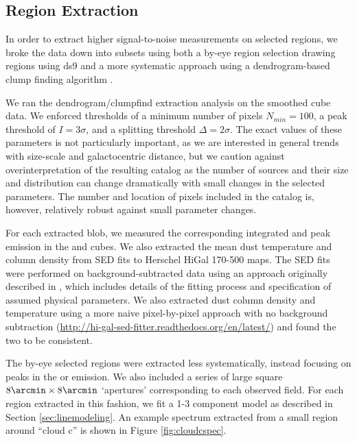 \subsection{Region Extraction}
In order to extract higher signal-to-noise measurements on selected regions, we
broke the data down into subsets using both a by-eye region selection drawing
regions using ds9 and a more systematic approach using a dendrogram-based clump
finding algorithm \citep[][\url{http://dendrograms.org/}]{Rosolowsky2008c}.

We ran the dendrogram/clumpfind extraction analysis on the smoothed
\threeohthree cube data.  We enforced thresholds of a minimum number of pixels
$N_{min}=100$, a peak threshold of $I = 3\sigma$, and a splitting threshold
$\Delta = 2\sigma$.  The exact values of these parameters is not particularly
important, as we are interested in general trends with size-scale and
galactocentric distance, but we caution against overinterpretation of the
resulting catalog as the number of sources and their size and distribution can
change dramatically with small changes in the selected parameters.  The number
and location of pixels included in the catalog is, however, relatively robust
against small parameter changes.

For each extracted blob, we measured the corresponding integrated and peak
emission in the \threetwoone and \thirteenco cubes.  We also extracted the mean
dust temperature and column density from SED fits to Herschel HiGal 170-500\um
maps.  The SED fits were performed on background-subtracted data using an
approach originally described in \citet{Battersby2011a}, which includes details
of the fitting process and specification of assumed physical parameters.  We
also extracted dust column density and temperature using a more naive
pixel-by-pixel approach with no background subtraction
(\url{http://hi-gal-sed-fitter.readthedocs.org/en/latest/}) and found the two
to be consistent.

The by-eye selected regions were extracted less systematically, instead
focusing on peaks in the \threeohthree or \threetwoone emission.  We also
included a series of large square $8\arcmin \times 8\arcmin$ `apertures'
corresponding to each observed field.  For each region extracted in this
fashion, we fit a 1-3 component model as described in Section
\ref{sec:linemodeling}.  An example spectrum extracted from a small region
around ``cloud c'' is shown in Figure \ref{fig:cloudcspec}.


